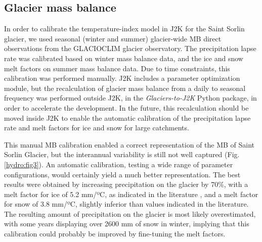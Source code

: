 \subsection{Glacier mass balance}

In order to calibrate the temperature-index model in J2K for the Saint Sorlin glacier, we used seasonal (winter and summer) glacier-wide MB direct observations from the GLACIOCLIM glacier observatory. The precipitation lapse rate was calibrated based on winter mass balance data, and the ice and snow melt factors on summer mass balance data. Due to time constraints, this calibration was performed manually. J2K includes a parameter optimization module, but the recalculation of glacier mass balance from a daily to seasonal frequency was performed outside J2K, in the \textit{Glaciers-to-J2K} Python package, in order to accelerate the development. In the future, this recalculation should be moved inside J2K to enable the automatic calibration of the precipitation lapse rate and melt factors for ice and snow for large catchments.

This manual MB calibration enabled a correct representation of the MB of Saint Sorlin Glacier, but the interannual variability is still not well captured (Fig. \ref{hydro:fig3}). An automatic calibration, testing a wide range of parameter configurations, would certainly yield a much better representation. The best results were obtained by increasing precipitation on the glacier by 70\%, with a melt factor for ice of 5.2 mm/ºC, as indicated in the literature \citep{reveillet_which_2017}, and a melt factor for snow of 3.8 mm/ºC, slightly inferior than values indicated in the literature. The resulting amount of precipitation on the glacier is most likely overestimated, with some years displaying over 2600 mm of snow in winter, implying that this calibration could probably be improved by fine-tuning the melt factors. 

